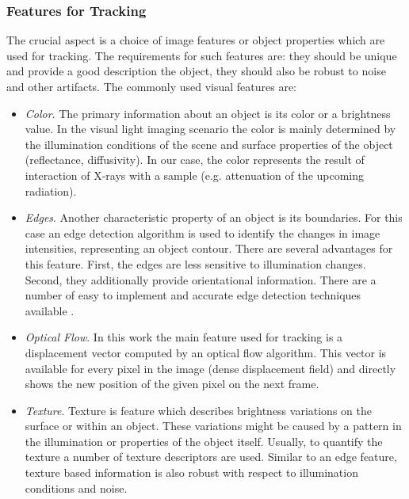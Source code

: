 \subsubsection{Features for Tracking}
\label{tracking_features}

The crucial aspect is a choice of image features or object properties which are used for tracking. The requirements for such features are: they should be unique and provide a good description the object, they should also be robust to noise and other artifacts.
The commonly used visual features are:

\begin{itemize}
   \item \textit{Color}. The primary information about an object is its color or a brightness value. In the visual light imaging scenario the color is mainly determined by the illumination conditions of the scene and surface properties of the object (reflectance, diffusivity). In our case, the color represents the result of interaction of X-rays with a sample (e.g. attenuation of the upcoming radiation).  
   
   \item \textit{Edges}. Another characteristic property of an object is its boundaries.
   For this case an edge detection algorithm is used to identify the changes in image intensities, representing an object contour. There are several advantages for this feature. First, the edges are less sensitive to illumination changes. Second, they additionally provide orientational information. There are a number of easy to implement and accurate edge detection techniques available \cite{Canny86, Bowyer01}.   

	\item \textit{Optical Flow}. In this work the main feature used for tracking is a displacement vector computed by an optical flow algorithm. This vector is available for every pixel in the image (dense displacement field) and directly shows the new position of the given pixel on the next frame.

\item \textit{Texture}. Texture is feature which describes brightness variations on the surface or within an object. These variations might be caused by a pattern in the illumination or properties of the object itself. Usually, to quantify the texture a number of texture descriptors are used. Similar to an edge feature, texture based information is also robust with respect to illumination conditions and noise.
\end{itemize}

